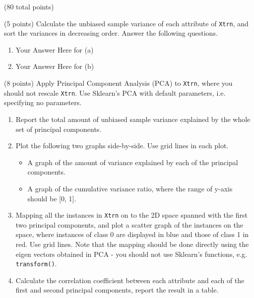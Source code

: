 \documentclass[12pt]{article}
\begin{document}
\begin{question}{(80 total points) \qOneTitle}
\begin{subquestion}{(5 points)
    Calculate the unbiased sample variance of each attribute of {\tt Xtrn}, and sort the variances in decreasing order. Answer the following questions.
  }
  \begin{answerbox}{0.5\textheight}
    \begin{enumerate}
    \item Your Answer Here for (a)
    \item Your Answer Here for (b)
    \end{enumerate}
  \end{answerbox}
  


\end{subquestion}

\begin{subquestion}{(8 points)
    Apply Principal Component Analysis (PCA) to {\tt Xtrn}, where you should not rescale {\tt Xtrn}.
    Use Sklearn's PCA with default parameters, i.e. specifying no parameters.
  }\label{q1:pca:wo/s}
  \begin{enumerate}\NARROWITEM
  \item Report the total amount of unbiased sample variance explained by the whole set of principal components.
  \item Plot the following two graphs side-by-side. Use grid lines in each plot.
    \begin{itemize}\NARROWITEM
    \item A graph of the amount of variance explained by each of the principal components.
    \item A graph of the cumulative variance ratio, where the range of y-axis should be [0, 1].
    \end{itemize}
  \item Mapping all the instances in {\tt Xtrn} on to the 2D space spanned with the first two principal components, and plot a scatter graph of the instances on the space, where instances of class 0 are displayed in blue and those of class 1 in red. Use grid lines. Note that the mapping should be done directly using the eigen vectors obtained in PCA - you should not use Sklearn's functions, e.g. {\tt transform()}. 
  \item Calculate the correlation coefficient between each attribute and each of the first and second principal components, report the result in a table.
  \end{enumerate}
   


\end{subquestion}
\end{question}
\end{document}

